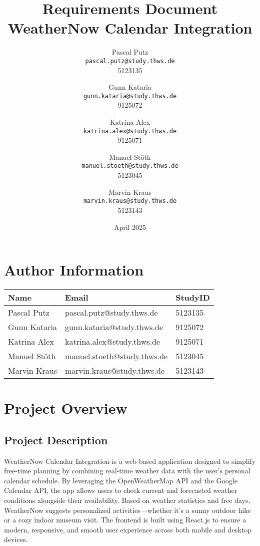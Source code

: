 \documentclass[fontsize=13pt,a4paper]{scrartcl}
\title{Requirements Document\\\large WeatherNow Calendar Integration}
\author{
  Pascal Putz \\ \texttt{pascal.putz@study.thws.de} \\ 5123135
  \and
  Gunn Kataria \\ \texttt{gunn.kataria@study.thws.de} \\ 9125072
  \and
  Katrina Alex \\ \texttt{katrina.alex@study.thws.de} \\ 9125071
  \and
  Manuel Stöth \\ \texttt{manuel.stoeth@study.thws.de} \\ 5123045
  \and
  Marvin Kraus \\ \texttt{marvin.kraus@study.thws.de} \\ 5123143
}
\date{April 2025}
\begin{document}
\maketitle

\section{Author Information}
\begin{longtable}{|p{5cm}|p{6cm}|p{3cm}|}
\hline
\textbf{Name} & \textbf{Email} & \textbf{StudyID} \\
\hline
Pascal Putz & pascal.putz@study.thws.de & 5123135 \\
\hline
Gunn Kataria & gunn.kataria@study.thws.de & 9125072 \\
\hline
Katrina Alex & katrina.alex@study.thws.de & 9125071 \\
\hline
Manuel Stöth & manuel.stoeth@study.thws.de & 5123045 \\
\hline
Marvin Kraus & marvin.kraus@study.thws.de & 5123143 \\
\hline
\end{longtable}

\newpage

\section{Project Overview}

\subsection{Project Description}
WeatherNow Calendar Integration is a web-based application designed to simplify free-time planning by combining real-time weather data with the user’s personal calendar schedule. By leveraging the OpenWeatherMap API and the Google Calendar API, the app allows users to check current and forecasted weather conditions alongside their availability. Based on weather statistics and free days, WeatherNow suggests personalized activities—whether it’s a sunny outdoor hike or a cozy indoor museum visit. The frontend is built using React.js to ensure a modern, responsive, and smooth user experience across both mobile and desktop devices.
\end{document}

